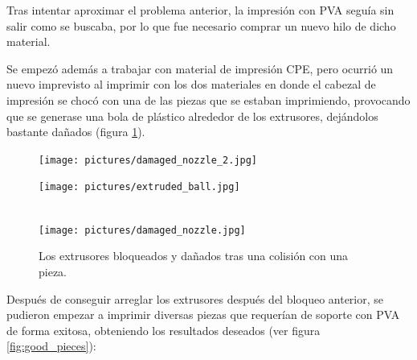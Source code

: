 Tras intentar aproximar el problema anterior, la impresión con \ac{PVA} seguía sin
salir como se buscaba, por lo que fue necesario comprar un nuevo hilo de dicho material.

Se empezó además a trabajar con material de impresión \ac{CPE}, pero ocurrió un nuevo
imprevisto al imprimir con los dos materiales en donde el cabezal de impresión
se chocó con una de las piezas que se estaban imprimiendo, provocando que se generase
una bola de plástico alrededor de los extrusores, dejándolos bastante dañados (figura
\ref{fig:damaged_nozzle}).

\begin{figure}[H]
    \centering
    \begin{minipage}{.49\linewidth}
        \texttt{[image: pictures/damaged\_nozzle\_2.jpg]}
    \end{minipage}
    \hfill
    \begin{minipage}{.49\linewidth}
        \texttt{[image: pictures/extruded\_ball.jpg]}
    \end{minipage}
    \hfill \\[1ex]
    \texttt{[image: pictures/damaged\_nozzle.jpg]}
    \caption{Los extrusores bloqueados y dañados tras una colisión con una pieza.}
    \label{fig:damaged_nozzle}
\end{figure}

Después de conseguir arreglar los extrusores después del bloqueo anterior, se pudieron
empezar a imprimir diversas piezas que requerían de soporte con \ac{PVA} de forma
exitosa, obteniendo los resultados deseados (ver figura \ref{fig:good_pieces}):

